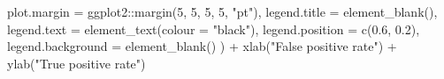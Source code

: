 \documentclass[
  11pt,
  oneside]{book}
\newenvironment{Shaded}{\begin{snugshade}}{\end{snugshade}}
\newcommand{\AttributeTok}[1]{\textcolor[rgb]{0.77,0.63,0.00}{#1}}
\newcommand{\DecValTok}[1]{\textcolor[rgb]{0.00,0.00,0.81}{#1}}
\newcommand{\FloatTok}[1]{\textcolor[rgb]{0.00,0.00,0.81}{#1}}
\newcommand{\FunctionTok}[1]{\textcolor[rgb]{0.00,0.00,0.00}{#1}}
\newcommand{\NormalTok}[1]{#1}
\newcommand{\SpecialCharTok}[1]{\textcolor[rgb]{0.00,0.00,0.00}{#1}}
\newcommand{\StringTok}[1]{\textcolor[rgb]{0.31,0.60,0.02}{#1}}
\begin{document}
\begin{Shaded}
\begin{Highlighting}[]
    \AttributeTok{plot.margin =}\NormalTok{ ggplot2}\SpecialCharTok{::}\FunctionTok{margin}\NormalTok{(}\DecValTok{5}\NormalTok{, }\DecValTok{5}\NormalTok{, }\DecValTok{5}\NormalTok{, }\DecValTok{5}\NormalTok{, }\StringTok{"pt"}\NormalTok{),}
    \AttributeTok{legend.title =} \FunctionTok{element\_blank}\NormalTok{(),}
    \AttributeTok{legend.text =} \FunctionTok{element\_text}\NormalTok{(}\AttributeTok{colour =} \StringTok{"black"}\NormalTok{),}
    \AttributeTok{legend.position =} \FunctionTok{c}\NormalTok{(}\FloatTok{0.6}\NormalTok{, }\FloatTok{0.2}\NormalTok{),}
    \AttributeTok{legend.background =} \FunctionTok{element\_blank}\NormalTok{()}
\NormalTok{  ) }\SpecialCharTok{+}
  \FunctionTok{xlab}\NormalTok{(}\StringTok{"False positive rate"}\NormalTok{) }\SpecialCharTok{+}
  \FunctionTok{ylab}\NormalTok{(}\StringTok{"True positive rate"}\NormalTok{)}
\end{Highlighting}
\end{Shaded}
\end{document}
